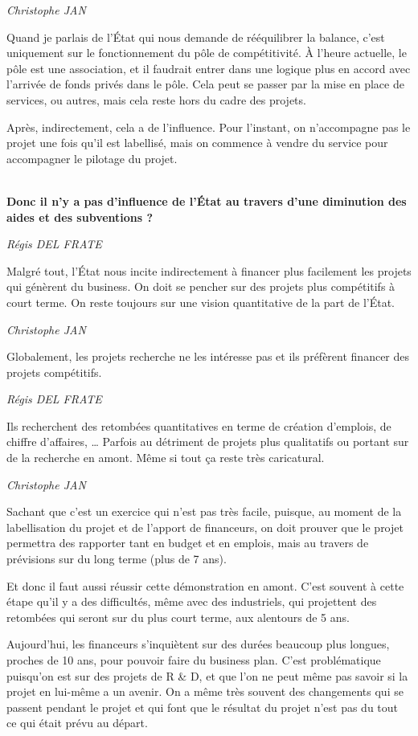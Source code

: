 \documentclass[a4paper,12pt]{report}
\begin{document}
	\emph{Christophe JAN}
	
    Quand je parlais de l’État qui nous demande de rééquilibrer la balance, c’est uniquement sur le fonctionnement du pôle de compétitivité. À l’heure actuelle, le pôle est une association, et il faudrait entrer dans une logique plus en accord avec l’arrivée de fonds privés dans le pôle. Cela peut se passer par la mise en place de services, ou autres, mais cela reste hors du cadre des projets.

    Après, indirectement, cela a de l’influence. Pour l’instant, on n’accompagne pas le projet une fois qu’il est labellisé, mais on commence à vendre du service pour accompagner le pilotage du projet. 

	\textbf{\\Donc il n’y a pas d’influence de l’État au travers d’une diminution des aides et des subventions ?}

	\emph{Régis DEL FRATE}
   
    Malgré tout, l’État nous incite indirectement à financer plus facilement les projets qui génèrent du business. On doit se pencher sur des projets plus compétitifs à court terme. On reste toujours sur une vision quantitative de la part de l’État.

	\emph{Christophe JAN}
	
    Globalement, les projets recherche ne les intéresse pas et ils préfèrent financer des projets compétitifs. 

	\emph{Régis DEL FRATE}
   
    Ils recherchent des retombées quantitatives en terme de création d’emplois, de chiffre d’affaires, … Parfois au détriment de projets plus qualitatifs ou portant sur de la recherche en amont. Même si tout ça reste très caricatural.

	\emph{Christophe JAN}
	 
    Sachant que c’est un exercice qui n’est pas très facile, puisque, au moment de la labellisation du projet et de l’apport de financeurs, on doit prouver que le projet permettra des rapporter tant en budget et en emplois, mais au travers de prévisions sur du long terme (plus de 7 ans). 

	Et donc il faut aussi réussir cette démonstration en amont. C’est souvent à cette étape qu’il y a des difficultés, même avec des industriels, qui projettent des retombées qui seront sur du plus court terme, aux alentours de 5 ans. 

	Aujourd’hui, les financeurs s’inquiètent sur des durées beaucoup plus longues, proches de 10 ans, pour pouvoir faire du business plan. C’est problématique puisqu’on est sur des projets de R \& D, et que l’on ne peut même pas savoir si la projet en lui-même a un avenir.
    On a même très souvent des changements qui se passent pendant le projet et qui font que le résultat du projet n’est pas du tout ce qui était prévu au départ.
\end{document}

